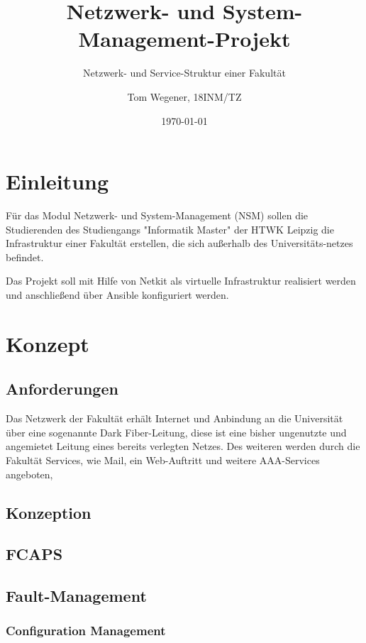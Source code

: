 \documentclass[a4paper]{article}
\title{Netzwerk- und System-Management-Projekt}
\subtitle{Netzwerk- und Service-Struktur einer Fakultät}
\date{\today}
\author{Tom Wegener, 18INM/TZ}
\begin{document}
\pagestyle{empty}

\maketitle

\newpage

\tableofcontents

\newpage

\pagestyle{fancy}

\setcounter{page}{1}

\section{Einleitung}
Für das Modul Netzwerk- und System-Management (NSM) sollen die Studierenden des Studiengangs "Informatik Master" der HTWK Leipzig die Infrastruktur einer Fakultät erstellen, die sich außerhalb des Universitäts-netzes befindet.

Das Projekt soll mit Hilfe von Netkit als virtuelle Infrastruktur realisiert werden und anschließend über Ansible konfiguriert werden.

\section{Konzept}

\subsection{Anforderungen}
Das Netzwerk der Fakultät erhält Internet und Anbindung an die Universität über eine sogenannte Dark Fiber-Leitung, diese ist eine bisher ungenutzte und angemietet Leitung eines bereits verlegten Netzes. Des weiteren werden durch die Fakultät Services, wie Mail, ein Web-Auftritt und weitere AAA-Services angeboten, 

\subsection{Konzeption}
\subsection{FCAPS}
\subsection{Fault-Management}
\subsubsection{Configuration Management}
\end{document}
